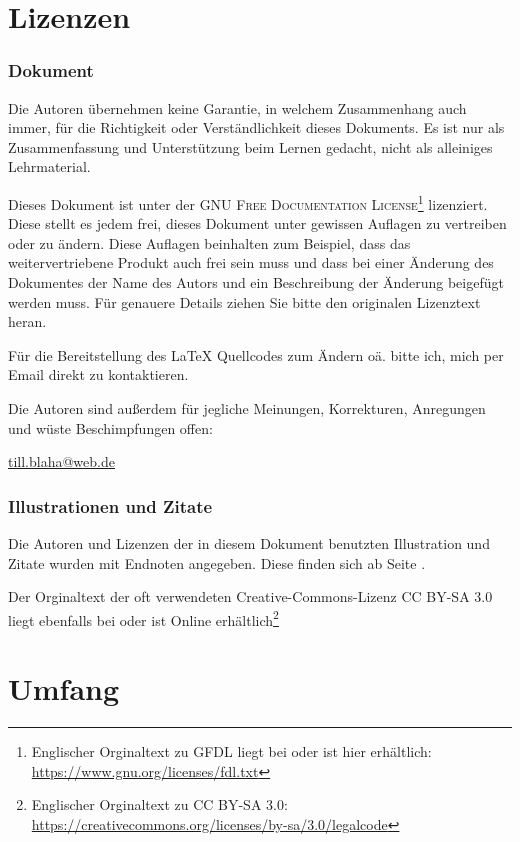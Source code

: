 \section*{Lizenzen}

\subsubsection*{Dokument}

Die Autoren übernehmen keine Garantie, in welchem Zusammenhang auch immer, für die Richtigkeit oder Verständlichkeit dieses Dokuments. Es ist nur als Zusammenfassung und Unterstützung beim Lernen gedacht, nicht als alleiniges Lehrmaterial.

Dieses Dokument ist unter der \textsc{GNU Free Documentation License}\footnote{Englischer Orginaltext zu \textsc{GFDL} liegt bei oder ist hier erhältlich: \url{https://www.gnu.org/licenses/fdl.txt}} lizenziert. Diese stellt es jedem frei, dieses Dokument unter gewissen Auflagen zu vertreiben oder zu ändern. Diese Auflagen beinhalten zum Beispiel, dass das weitervertriebene Produkt auch frei sein muss und dass bei einer Änderung des Dokumentes der Name des Autors und ein Beschreibung der Änderung beigefügt werden muss. Für genauere Details ziehen Sie bitte den originalen Lizenztext heran.

Für die Bereitstellung des \LaTeX{} Quellcodes zum Ändern oä. bitte ich, mich per Email direkt zu kontaktieren.

Die Autoren sind außerdem für jegliche Meinungen, Korrekturen, Anregungen und wüste Beschimpfungen offen:

\href{mailto:till.blaha@web.de}{till.blaha@web.de}


\subsubsection*{Illustrationen und Zitate}

Die Autoren und Lizenzen der in diesem Dokument benutzten Illustration und Zitate wurden mit Endnoten angegeben. Diese finden sich ab Seite \pageref{endnotes}.

Der Orginaltext der oft verwendeten \glqq Creative-Commons\grqq -Lizenz \textsc{CC BY-SA 3.0} liegt ebenfalls bei oder ist Online erhältlich\footnote{Englischer Orginaltext zu \textsc{CC BY-SA 3.0}: \url{https://creativecommons.org/licenses/by-sa/3.0/legalcode}}


\section*{Umfang}

